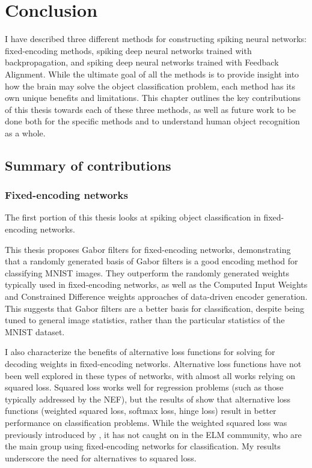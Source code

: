 \chapter{Conclusion}

I have described three different methods
for constructing spiking neural networks:
fixed-encoding methods, spiking deep neural networks trained with backpropagation,
and spiking deep neural networks trained with Feedback Alignment.
While the ultimate goal of all the methods
is to provide insight into how the brain may solve
the object classification problem,
each method has its own unique benefits and limitations.
This chapter outlines the key contributions of this thesis
towards each of these three methods,
as well as future work to be done both for the specific methods
and to understand human object recognition as a whole.


\section{Summary of contributions}

\subsection{Fixed-encoding networks}

The first portion of this thesis
looks at spiking object classification in fixed-encoding networks.

This thesis proposes Gabor filters for fixed-encoding networks,
demonstrating that a randomly generated basis of Gabor filters
is a good encoding method for classifying MNIST images.
They outperform the randomly generated weights
typically used in fixed-encoding networks,
as well as the Computed Input Weights and Constrained Difference weights
approaches of data-driven encoder generation.
This suggests that Gabor filters are a better basis for classification,
despite being tuned to general image statistics,
rather than the particular statistics of the MNIST dataset.

I also characterize the benefits of alternative loss functions
for solving for decoding weights in fixed-encoding networks.
Alternative loss functions have not been well explored
in these types of networks,
with almost all works relying on squared loss.
Squared loss works well for regression problems (such as those typically addressed by the NEF),
but the results of  show that alternative loss functions
(weighted squared loss, softmax loss, hinge loss)
result in better performance on classification problems.
While the weighted squared loss was previously introduced by \textcite{Toh2008},
it has not caught on in the ELM community,
who are the main group using fixed-encoding networks for classification.
My results underscore the need for alternatives to squared loss.

